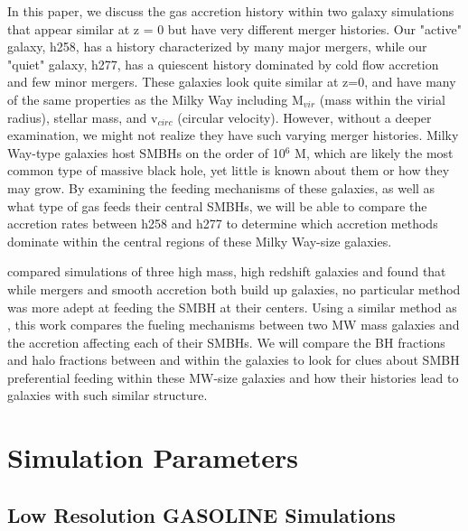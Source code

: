 \documentclass[manuscript]{aastex}
\begin{document}
	 In this paper, we discuss the gas accretion history within two galaxy simulations that appear similar at z = 0 but have very different merger histories. Our "active" galaxy, h258, has a history characterized by many major mergers, while our "quiet" galaxy, h277, has a quiescent history dominated by cold flow accretion and few minor mergers. These galaxies look quite similar at z=0, and have many of the same properties as the Milky Way including M$_{vir}$ (mass within the virial radius), stellar mass, and v$_{circ}$ (circular velocity). However, without a deeper examination, we might not realize they have such varying merger histories. Milky Way-type galaxies host SMBHs on the order of 10$^6$ M, which are likely the most common type of massive black hole, yet little is known about them or how they may grow. By examining the feeding mechanisms of these galaxies, as well as what type of gas feeds their central SMBHs, we will be able to compare the accretion rates between h258 and h277 to determine which accretion methods dominate within the central regions of these Milky Way-size galaxies. 
	
	\cite{Bellovary2013} compared simulations of three high mass, high redshift galaxies and found that while mergers and smooth accretion both build up galaxies, no particular method was more adept at feeding the SMBH at their centers. Using a similar method as \cite{Bellovary2013}, this work compares the fueling mechanisms between two MW mass galaxies and the accretion affecting each of their SMBHs. We will compare the BH fractions and halo fractions between and within the galaxies to look for clues about SMBH preferential feeding within these MW-size galaxies and how their histories lead to galaxies with such similar structure.
	
	
	
	
	
	
  
\section{Simulation Parameters}\label{sec-model}

\subsection{Low Resolution GASOLINE Simulations}
\end{document}
